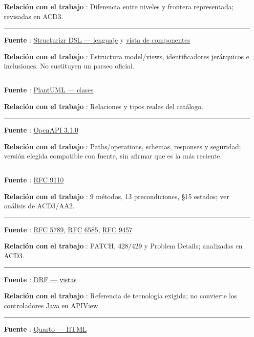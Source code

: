 \documentclass[11pt,a4paper]{article}
\begin{document}
\textbf{Relación con el trabajo }: Diferencia entre niveles y frontera
representada; revisadas en ACD3.

\medskip\hrule\medskip

\textbf{Fuente
}: \href{https://docs.structurizr.com/dsl/language}{Structurizr DSL ---
lenguaje} y
\href{https://docs.structurizr.com/dsl/cookbook/component-view/}{vista
de componentes}

\textbf{Relación con el trabajo }: Estructura model/views,
identificadores jerárquicos e inclusiones. No sustituyen un parseo
oficial.

\medskip\hrule\medskip

\textbf{Fuente }: \href{https://plantuml.com/class-diagram}{PlantUML ---
clases}

\textbf{Relación con el trabajo }: Relaciones y tipos reales del
catálogo.

\medskip\hrule\medskip

\textbf{Fuente }: \href{https://spec.openapis.org/oas/v3.1.0}{OpenAPI
3.1.0}

\textbf{Relación con el trabajo }: Paths/operations, schemas, responses
y seguridad; versión elegida compatible con fuente, sin afirmar que es
la más reciente.

\medskip\hrule\medskip

\textbf{Fuente }: \href{https://www.rfc-editor.org/rfc/rfc9110.html}{RFC
9110}

\textbf{Relación con el trabajo }: 9 métodos, 13 precondiciones, §15
estados; ver análisis de ACD3/AA2.

\medskip\hrule\medskip

\textbf{Fuente }: \href{https://www.rfc-editor.org/rfc/rfc5789.html}{RFC
5789}, \href{https://www.rfc-editor.org/rfc/rfc6585.html}{RFC 6585},
\href{https://www.rfc-editor.org/rfc/rfc9457.html}{RFC 9457}

\textbf{Relación con el trabajo }: PATCH, 428/429 y Problem Details;
analizadas en ACD3.

\medskip\hrule\medskip

\textbf{Fuente
}: \href{https://www.django-rest-framework.org/api-guide/views/}{DRF ---
vistas}

\textbf{Relación con el trabajo }: Referencia de tecnología exigida; no
convierte los controladores Java en APIView.

\medskip\hrule\medskip

\textbf{Fuente
}: \href{https://quarto.org/docs/output-formats/html-basics.html}{Quarto
--- HTML}
\end{document}
